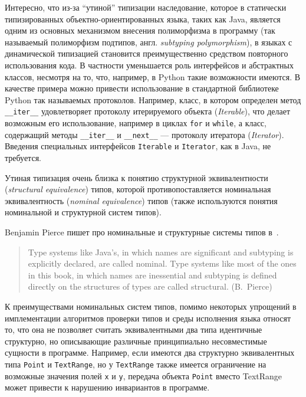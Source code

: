Интересно, что из-за ``утиной'' типизации наследование, которое в статически
типизированных объектно-ориентированных языка, таких как Java, является
одним из основных механизмом внесения полиморфизма в программу (так называемый
полиморфизм подтипов, англ. \emph{subtyping polymorphism}),
в языках с динамической типизацией становится преимущественно средством
повторного использования кода. В частности уменьшается роль интерфейсов и
абстрактных классов, несмотря на то, что, например, в Python такие возможности
имеются. В качестве примера можно привести использование в
стандартной библиотеке Python так называемых протоколов. Например, класс, в
котором определен метод \texttt{\_\_iter\_\_} удовлетворяет протоколу
итерируемого объекта (\emph{Iterable}), что делает возможным его использование,
например в циклах \texttt{for} и \texttt{while}, а класс, содержащий методы
\texttt{\_\_iter\_\_} и \texttt{\_\_next\_\_} --- протоколу итератора
(\emph{Iterator}).  Введения специальных интерфейсов \texttt{Iterable}
и \texttt{Iterator}, как в Java, не требуется.

Утиная типизация очень близка к понятию структурной эквивалентности
(\emph{structural equivalence}) типов, которой противопоставляется номинальная
эквивалентность (\emph{nominal equivalence}) типов (также используются понятия
номинальной и структурной систем типов).

Benjamin Pierce пишет про номинальные и структурные системы типов в~\cite{Pierce2002}.

\begin{quote}
Type systems like Java’s, in which names are significant and subtyping is
explicitly declared, are called nominal. Type systems like most of the ones in
this book, in which names are inessential and subtyping is defined directly on
the structures of types are called structural.
(B.~Pierce)
\end{quote}

К преимуществами номинальных систем типов, помимо некоторых упрощений в
имплементации алгоритмов проверки типов и среды исполнения языка относят то,
что она не позволяет считать эквивалентными два типа идентичные структурно, но
описывающие различные принципиально несовместимые сущности в программе.
Например, если имеются два структурно эквивалентных типа \texttt{Point} и
\texttt{TextRange}, но у \texttt{TextRange} также имеется ограничение на
возможные значения полей \texttt{x} и \texttt{y}, передача объекта \texttt{Point} вместо
TextRange может привести к нарушению инвариантов в программе.

